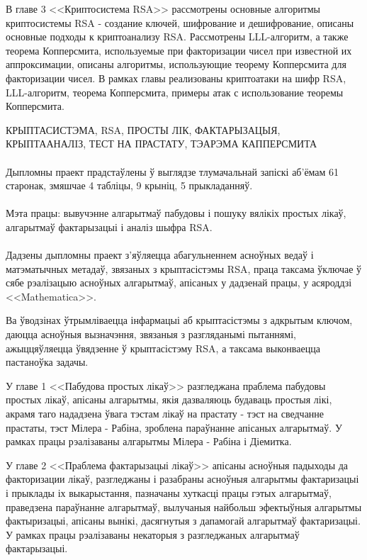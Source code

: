	В главе 3 <<Криптосистема RSA>> рассмотрены основные алгоритмы криптосистемы RSA - создание ключей, шифрование и дешифрование, описаны основные
	подходы к криптоанализу RSA. Рассмотрены LLL-алгоритм, а также теорема Копперсмита, используемые при факторизации чисел при известной их 
	аппроксимации, описаны алгоритмы, использующие теорему Копперсмита для факторизации чисел. В рамках главы реализованы криптоатаки на шифр RSA, LLL-алгоритм, теорема 
	Копперсмита, примеры атак с использование теоремы Копперсмита.

\newpage

КРЫПТАСИСТЭМА, RSA, ПРОСТЫ ЛIК, ФАКТАРЫЗАЦЫЯ, КРЫПТААНАЛIЗ, ТЕСТ НА ПРАСТАТУ, ТЭАРЭМА КАППЕРСМИТА

\paragraph{} Дыпломны праект прадстаўлены ў выглядзе тлумачальнай запіскі аб'ёмам 61 старонак, змяшчае 4 табліцы, 9 крыніц, 5 прыкладанняў.

\paragraph{} Мэта працы: вывучэнне алгарытмаў пабудовы і пошуку вялікіх простых лікаў, алгарытмаў фактарызацыі і аналіз шыфра RSA.

\paragraph{} Дадзены дыпломны праект з'яўляецца абагульненнем асноўных ведаў і матэматычных метадаў, звязаных з крыптасістэмы RSA, праца таксама
ўключае ў сябе рэалізацыю асноўных алгарытмаў, апісаных у дадзенай працы, у асяроддзі <<Mathematica>>.

Ва ўводзінах ўтрымліваецца інфармацыі аб крыптасістэмы з адкрытым ключом, даюцца асноўныя вызначэння, звязаныя з разгляданымі пытаннямі,
ажыццяўляецца ўвядзенне ў крыптасістэму RSA, а таксама выконваецца пастаноўка задачы.

У главе 1 <<Пабудова простых лікаў>> разгледжана праблема пабудовы простых лікаў, апісаны алгарытмы, якія дазваляюць будаваць простыя лікі,
акрамя таго нададзена ўвага тэстам лікаў на прастату - тэст на сведчанне прастаты, тэст Мілера - Рабіна, зроблена параўнанне апісаных алгарытмаў. У рамках
працы рэалізаваны алгарытмы Мілера - Рабіна і Діемитка.

У главе 2 <<Праблема фактарызацыі лікаў>> апісаны асноўныя падыходы да факторизации лікаў, разгледжаны і разабраны асноўныя алгарытмы фактаризацыі і прыклады іх выкарыстання, пазначаны хуткасці працы гэтых алгарытмаў, праведзена параўнанне алгарытмаў, вылучаныя найбольш эфектыўныя алгарытмы фактыризацыі, апісаны вынікі, дасягнутыя з дапамогай алгарытмаў фактаризацыі. У рамках працы рэалізаваны некаторыя з разгледжаных алгарытмаў фактарызацыі.


